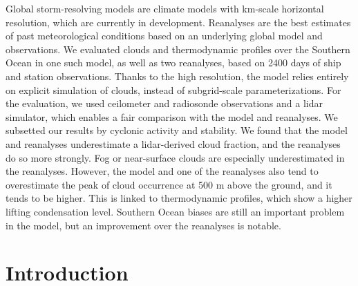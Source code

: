 \documentclass[draft]{agujournal2019}
\begin{document}
Global storm-resolving models are climate models with km-scale horizontal resolution, which are currently in development. Reanalyses are the best estimates of past meteorological conditions based on an underlying global model and observations. We evaluated clouds and thermodynamic profiles over the Southern Ocean in one such model, as well as two reanalyses, based on 2400 days of ship and station observations. Thanks to the high resolution, the model relies entirely on explicit simulation of clouds, instead of subgrid-scale parameterizations. For the evaluation, we used ceilometer and radiosonde observations and a lidar simulator, which enables a fair comparison with the model and reanalyses. We subsetted our results by cyclonic activity and stability. We found that the model and reanalyses underestimate a lidar-derived cloud fraction, and the reanalyses do so more strongly. Fog or near-surface clouds are especially underestimated in the reanalyses. However, the model and one of the reanalyses also tend to overestimate the peak of cloud occurrence at 500 m above the ground, and it tends to be higher. This is linked to thermodynamic profiles, which show a higher lifting condensation level. Southern Ocean biases are still an important problem in the model, but an improvement over the reanalyses is notable.

\section{Introduction}
\label{sec:introduction}
\end{document}
